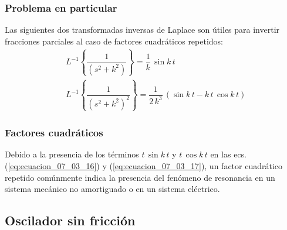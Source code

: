 \begin{frame}
\frametitle{Problema en particular}
Las siguientes dos transformadas inversas de Laplace son útiles para invertir fracciones parciales al caso de factores cuadráticos repetidos:
\pause
\begin{align}
&L^{-1} \left\{ \dfrac{1}{(s^{2} + k^{2})} \right\} = \dfrac{1}{ k} \, \sin k \, t \label{eq:ecuacion_07_03_16} \\[0.5em]
&L^{-1} \left\{ \dfrac{1}{(s^{2} + k^{2})^{2}} \right\} = \dfrac{1}{2 \, k^{3}} \, (\sin k \, t - k \, t \, \cos k \, t) \label{eq:ecuacion_07_03_17}
\end{align}
\end{frame}
\begin{frame}
\frametitle{Factores cuadráticos}
Debido a la presencia de los términos $t \, \sin k \, t$ y $t \, \cos k \, t$ en las ecs. (\ref{eq:ecuacion_07_03_16}) y (\ref{eq:ecuacion_07_03_17}), \pause un factor cuadrático repetido comúnmente indica la presencia del fenómeno de resonancia en un sistema mecánico no amortiguado o en un sistema eléctrico.
\end{frame}

\subsection{Oscilador sin fricción}

